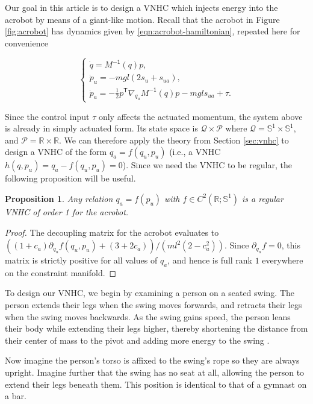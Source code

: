 \documentclass[journal,twoside,onecolumn,draftclsnofoot,web]{ieeecolor}
\newtheorem{prop}{Proposition} %
\newcommand*{\tpose}{^\mathsf{T}}
\newcommand*{\R}{\mathbb{R}}
\newcommand*{\Sone}{\mathbb{S}^1}
\newcommand*{\Minv}{M^\mathsf{-1}}
\begin{document}
Our goal in this article is to design a VNHC which injects energy into the
acrobot by means of a giant-like motion.
Recall that the acrobot in Figure \ref{fig:acrobot} has dynamics given by
\eqref{eqn:acrobot-hamiltonian}, repeated here for convenience{
    \begin{equation*}
     \begin{cases}
        \dot{q} = \Minv(q) p 
        ,\\
        \dot{p}_u = -mgl\left(2s_u + s_{ua}\right) 
        ,\\
        \dot{p}_a =-\frac{1}{2}p\tpose \nabla_{q_a}\Minv(q) p
        - mgl s_{ua} + \tau.
    \end{cases}
\end{equation*}

Since the control input \(\tau\) only affects the actuated momentum,
the system above is already in simply actuated form.
Its state space is \(\mathcal{Q} \times \mathcal{P}\) where
\(\mathcal{Q} = \Sone \times \Sone\), and
\(\mathcal{P} = \R \times \R\).
We can therefore apply the theory from Section \ref{sec:vnhc} to design
a VNHC of the form \(q_a = f(q_u,p_u)\) (i.e., a VNHC 
\(h(q,p_u) = q_a - f(q_u,p_u) = 0\)).
Since we need the VNHC to be regular, the following proposition will be
useful.
\begin{prop}\label{prop:acrobot-fpu-regular}
    Any relation \(q_a = f(p_u)\) 
    with \(f \in C^2\left(\R; \Sone\right)\) is a regular
    VNHC of order 1 for the acrobot.
\end{prop}
\begin{proof}
    The decoupling matrix for the acrobot evaluates to
    \(((1+c_a)\partial_{q_u}f(q_u,p_u) + (3+2c_a))/(ml^2(2-c_a^2))\).
    Since \(\partial_{q_u} f = 0\), this matrix is strictly positive for all values
    of \(q_a\), and hence is full rank \(1\) everywhere on the constraint manifold.
\end{proof}

To design our VNHC, we begin by examining a person on a
seated swing.
The person extends their legs when the swing moves forwards, and retracts their
legs when the swing moves backwards.
As the swing gains speed, the person leans their body while
extending their legs higher, thereby shortening the distance
from their center of mass to the pivot and adding more energy to the swing
\cite{how_to_pump_a_swing}.

Now imagine the person's torso is affixed to the swing's rope so they are
always upright. 
Imagine further that the swing has no seat at all, allowing the person to extend
their legs beneath them. 
This position is identical to that of a gymnast on a bar.

}
\end{document}
